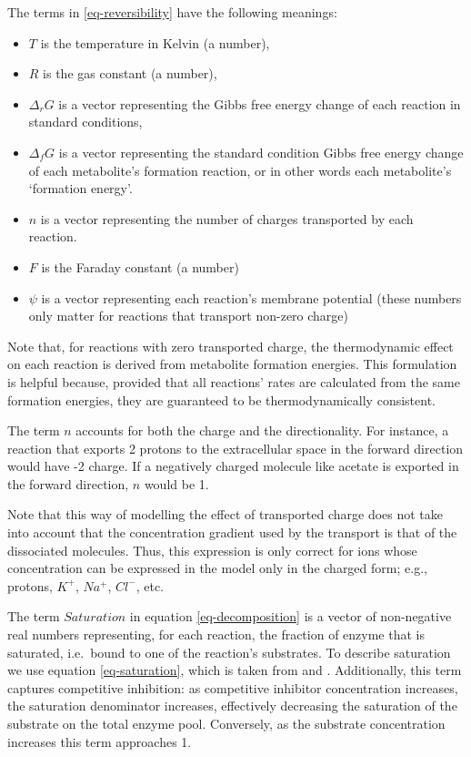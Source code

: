 \documentclass[journal=asbcd6,manuscript=article,layout=traditional]{achemso}
\providecommand{\tightlist}{%
  \setlength{\itemsep}{0pt}\setlength{\parskip}{0pt}}\usepackage{longtable,booktabs,array}
\begin{document}
The terms in \eqref{eq-reversibility} have the following meanings:

\begin{itemize}
\tightlist
\item
  \(T\) is the temperature in Kelvin (a number),
\item
  \(R\) is the gas constant (a number),
\item
  \(\Delta_rG\) is a vector representing the Gibbs free energy change of
  each reaction in standard conditions,
\item
  \(\Delta_fG\) is a vector representing the standard condition Gibbs
  free energy change of each metabolite's formation reaction, or in
  other words each metabolite's `formation energy'.
\item
  \(n\) is a vector representing the number of charges transported by
  each reaction.
\item
  \(F\) is the Faraday constant (a number)
\item
  \(\psi\) is a vector representing each reaction's membrane potential
  (these numbers only matter for reactions that transport non-zero
  charge)
\end{itemize}

Note that, for reactions with zero transported charge, the thermodynamic
effect on each reaction is derived from metabolite formation energies.
This formulation is helpful because, provided that all reactions' rates
are calculated from the same formation energies, they are guaranteed to
be thermodynamically consistent.

The term \(n\) accounts for both the charge and the directionality. For
instance, a reaction that exports 2 protons to the extracellular space
in the forward direction would have -2 charge. If a negatively charged
molecule like acetate is exported in the forward direction, \(n\) would
be 1.

Note that this way of modelling the effect of transported charge does
not take into account that the concentration gradient used by the
transport is that of the dissociated molecules. Thus, this expression is
only correct for ions whose concentration can be expressed in the model
only in the charged form; e.g., protons, \(K^+\), \(Na^+\), \(Cl^-\),
etc.

The term \(Saturation\) in equation \eqref{eq-decomposition} is a vector
of non-negative real numbers representing, for each reaction, the
fraction of enzyme that is saturated, i.e.~bound to one of the
reaction's substrates. To describe saturation we use equation
\eqref{eq-saturation}, which is taken from
\citet{liebermeister_modular_2010} and \citet{noor_note_2013}.
Additionally, this term captures competitive inhibition: as competitive
inhibitor concentration increases, the saturation denominator increases,
effectively decreasing the saturation of the substrate on the total
enzyme pool. Conversely, as the substrate concentration increases this
term approaches 1.
\end{document}
